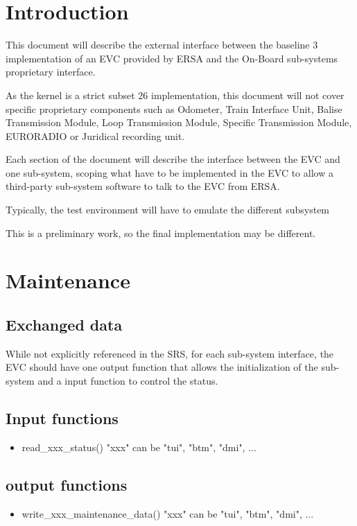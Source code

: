 \documentclass{template/openetcs_article}
\begin{document}


\section{Introduction}

This document will describe the external interface between the baseline 3 implementation of an EVC provided by ERSA and the On-Board sub-systems proprietary interface.

As the kernel is a strict subset 26 implementation, this document will not cover specific proprietary components such as Odometer, Train Interface Unit, Balise Transmission Module, Loop Transmission Module, Specific Transmission Module, EURORADIO or Juridical recording unit.

Each section of the document will describe the interface between the EVC and one sub-system, scoping what have to be implemented in the EVC to allow a third-party sub-system software to talk to the EVC from ERSA.

Typically, the test environment will have to emulate the different subsystem 

This is a preliminary work, so the final implementation may be different. 

\section{Maintenance}
	\subsection{Exchanged data}
		While not explicitly referenced in the SRS, for each sub-system interface, the EVC should have one output function that allows the initialization of the sub-system and a input function to control the status.
	\subsection{Input functions}
		\begin{itemize}
			\item read\_xxx\_status()
				\subitem "xxx" can be "tui", "btm", "dmi", ...
		\end{itemize}
	\subsection{output functions}
		\begin{itemize}
			\item write\_xxx\_maintenance\_data()
				\subitem "xxx" can be "tui", "btm", "dmi", ...
		\end{itemize}
\end{document}
